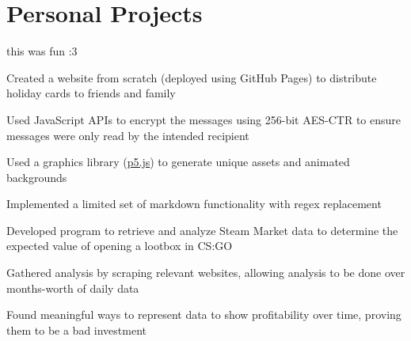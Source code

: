 \section{Personal Projects}

\begin{bullets}
    \item this was fun :3 %
\end{bullets}


\begin{bullets}
    \item Created a website from scratch (deployed using GitHub Pages) to distribute holiday cards to friends and family
    \item Used JavaScript APIs to encrypt the messages using 256-bit AES-CTR to ensure messages were only read by the intended recipient
    \item Used a graphics library (\href{https://p5js.org}{p5.js}) to generate unique assets and animated backgrounds
    \item Implemented a limited set of markdown functionality with regex replacement
\end{bullets}

\begin{bullets}
    \item Developed program to retrieve and analyze Steam Market data to determine the expected value of opening a lootbox in CS:GO
    \item Gathered analysis by scraping relevant websites, allowing analysis to be done over months-worth of daily data
    \item Found meaningful ways to represent data to show profitability over time, proving them to be a bad investment
\end{bullets}
